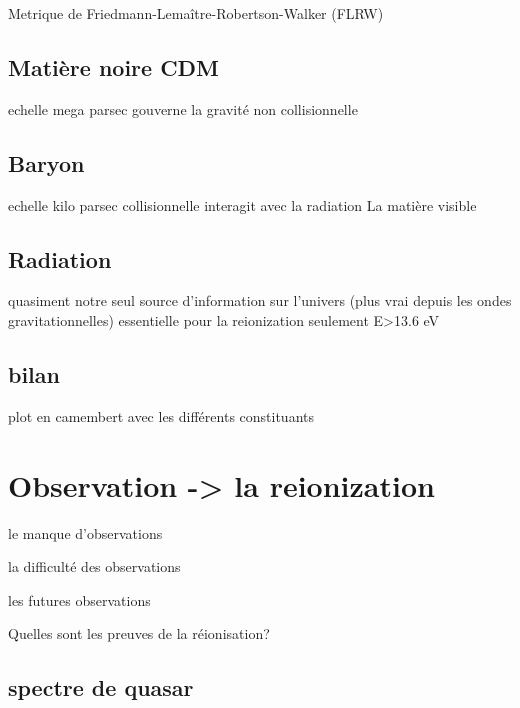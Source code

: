 Metrique de Friedmann-Lemaître-Robertson-Walker (FLRW)

\subsection{Matière noire CDM}

echelle mega parsec
gouverne la gravité
non collisionnelle

\subsection{Baryon}

echelle kilo parsec
collisionnelle
interagit avec la radiation
La matière visible

\subsection{Radiation}

quasiment notre seul source d'information sur l'univers (plus vrai depuis les ondes gravitationnelles)
essentielle pour la reionization
seulement E>13.6 eV

\subsection{bilan}

plot en camembert avec les différents constituants

\section{Observation -> la reionization}

le manque d'observations

la difficulté des observations

les futures observations

Quelles sont les preuves de la réionisation?

\subsection{spectre de quasar}

